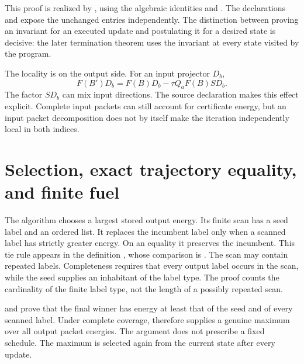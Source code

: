 This proof is realized by , using the algebraic identities
 and . The declarations
 and  expose the unchanged
entries independently. The distinction between proving an invariant for an
executed update and postulating it for a desired state is decisive: the later
termination theorem uses the invariant at every state visited by the program.

The locality is on the output side. For an input projector $D_b$,
\[
 F(B')D_b=F(B)D_b-\tau Q_aF(B)SD_b.
\]
The factor $SD_b$ can mix input directions. The source declaration
 makes this effect explicit. Complete input packets
can still account for certificate energy, but an input packet decomposition does
not by itself make the iteration independently local in both indices.

\section{Selection, exact trajectory equality, and finite fuel}
\label{sec:solver-termination}

The algorithm chooses a largest stored output energy. Its finite scan has a seed
label and an ordered list. It replaces the incumbent label only when a scanned
label has strictly greater energy. On an equality it preserves the incumbent.
This tie rule appears in the definition , whose comparison is
. The scan may contain repeated labels. Completeness requires
that every output label occurs in the scan, while the seed supplies an inhabitant
of the label type. The proof counts the cardinality of the finite label type,
not the length of a possibly repeated scan.

 and  prove that the final winner
has energy at least that of the seed and of every scanned label. Under complete
coverage,  therefore supplies a genuine maximum over all
output packet energies. The argument does not prescribe a fixed schedule. The
maximum is selected again from the current state after every update.

